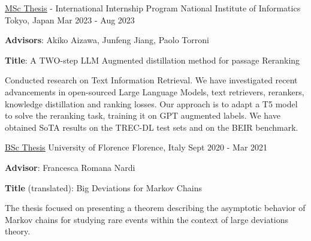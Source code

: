 

\begin{cventries}

  \cventry
    {\href{https://amslaurea.unibo.it/30082/}{\underline{MSc Thesis}} - International Internship Program} %
    {National Institute of Informatics} %
    {Tokyo, Japan} %
    {Mar 2023 - Aug 2023} %
    {
      \begin{cvitems} %
        \item {\textbf{Advisors}: Akiko Aizawa, Junfeng Jiang, Paolo Torroni} 
        \item {\textbf{Title}: A TWO-step LLM Augmented distillation method for passage Reranking}
        \item {Conducted research on Text Information Retrieval. We have investigated recent advancements in open-sourced Large Language Models, text retrievers, rerankers,  knowledge distillation and ranking losses. Our approach is to adapt a T5 model to solve the reranking task, training it on GPT augmented labels. We have obtained SoTA results on the TREC-DL test sets and on the BEIR benchmark.}
      \end{cvitems}
    }

  \cventry
    {\href{https://github.com/Freddavide/Freddavide/blob/main/elaborato_B036_Baldelli_Davide.pdf}{\underline{BSc Thesis}}} %
    {University of Florence} %
    {Florence, Italy} %
    {Sept 2020 - Mar 2021} %
    {
      \begin{cvitems} %
        \item {\textbf{Advisor}: Francesca Romana Nardi}
        \item {\textbf{Title} (translated): Big Deviations for Markov Chains}
        \item {The thesis focused on presenting a theorem describing the asymptotic behavior of Markov chains for studying rare events within the context of large deviations theory.}
      \end{cvitems}
    }



\end{cventries}
